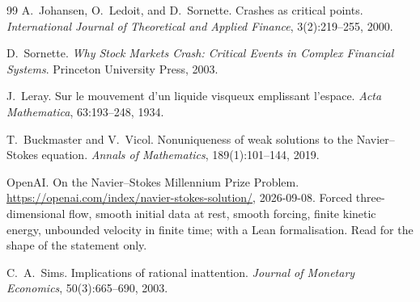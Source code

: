 \documentclass[11pt]{article}
\begin{document}
\begin{thebibliography}{99}
 A.~Johansen, O.~Ledoit, and D.~Sornette. Crashes as critical points. \emph{International Journal of Theoretical and Applied Finance}, 3(2):219--255, 2000.

 D.~Sornette. \emph{Why Stock Markets Crash: Critical Events in Complex Financial Systems}. Princeton University Press, 2003.

 J.~Leray. Sur le mouvement d'un liquide visqueux emplissant l'espace. \emph{Acta Mathematica}, 63:193--248, 1934.

 T.~Buckmaster and V.~Vicol. Nonuniqueness of weak solutions to the Navier--Stokes equation. \emph{Annals of Mathematics}, 189(1):101--144, 2019.

 OpenAI. On the Navier--Stokes Millennium Prize Problem. \url{https://openai.com/index/navier-stokes-solution/}, 2026-09-08. Forced three-dimensional flow, smooth initial data at rest, smooth forcing, finite kinetic energy, unbounded velocity in finite time; with a Lean formalisation. Read for the shape of the statement only.

 C.~A.~Sims. Implications of rational inattention. \emph{Journal of Monetary Economics}, 50(3):665--690, 2003.

\end{thebibliography}
\end{document}
